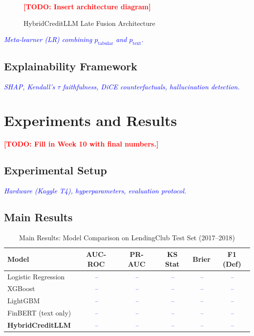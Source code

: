 \documentclass[preprint,12pt]{elsarticle}
\newcommand{\TODO}[1]{\textcolor{red}{\textbf{[TODO: #1]}}}
\newcommand{\PLACEHOLDER}[1]{\textcolor{blue}{\textit{#1}}}
\begin{document}
\begin{figure}[h]
\centering
\TODO{Insert architecture diagram}
\caption{HybridCreditLLM Late Fusion Architecture}
\label{fig:architecture}
\end{figure}

\PLACEHOLDER{Meta-learner (LR) combining $p_{\text{tabular}}$ and $p_{\text{text}}$.}

\subsection{Explainability Framework}
\PLACEHOLDER{SHAP, Kendall's $\tau$ faithfulness, DiCE counterfactuals, hallucination detection.}


\section{Experiments and Results}
\label{sec:results}

\TODO{Fill in Week 10 with final numbers.}

\subsection{Experimental Setup}
\PLACEHOLDER{Hardware (Kaggle T4), hyperparameters, evaluation protocol.}

\subsection{Main Results}

\begin{table}[h]
\centering
\caption{Main Results: Model Comparison on LendingClub Test Set (2017--2018)}
\label{tab:main_results}
\begin{tabular}{lccccc}
\toprule
\textbf{Model} & \textbf{AUC-ROC} & \textbf{PR-AUC} & \textbf{KS Stat} & \textbf{Brier} & \textbf{F1 (Def)} \\
\midrule
Logistic Regression & \PLACEHOLDER{--} & \PLACEHOLDER{--} & \PLACEHOLDER{--} & \PLACEHOLDER{--} & \PLACEHOLDER{--} \\
XGBoost             & \PLACEHOLDER{--} & \PLACEHOLDER{--} & \PLACEHOLDER{--} & \PLACEHOLDER{--} & \PLACEHOLDER{--} \\
LightGBM            & \PLACEHOLDER{--} & \PLACEHOLDER{--} & \PLACEHOLDER{--} & \PLACEHOLDER{--} & \PLACEHOLDER{--} \\
FinBERT (text only) & \PLACEHOLDER{--} & \PLACEHOLDER{--} & \PLACEHOLDER{--} & \PLACEHOLDER{--} & \PLACEHOLDER{--} \\
\textbf{HybridCreditLLM} & \PLACEHOLDER{--} & \PLACEHOLDER{--} & \PLACEHOLDER{--} & \PLACEHOLDER{--} & \PLACEHOLDER{--} \\
\bottomrule
\end{tabular}
\end{table}
\end{document}
